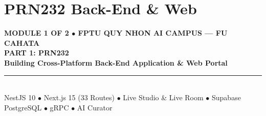 \documentclass[aspectratio=169,10pt]{beamer}
\begin{document}
\section{PRN232 Back-End \& Web}
{
\begin{frame}[plain]
  \begin{center}
    \vspace{10mm}
    {\scriptsize\bfseries\color{omniCyan}MODULE 1 OF 2 $\bullet$ FPTU QUY NHON AI CAMPUS --- FU CAHATA}\\[3mm]
    {\Huge\bfseries\color{white}PART 1: PRN232}\\[3mm]
    {\Large\bfseries\color{omniBlue}Building Cross-Platform Back-End Application \& Web Portal}\\[4mm]
    {\color{omniBorder}\rule{0.5\linewidth}{1pt}}\\[4mm]
    {\footnotesize\color{omniSlate}NestJS 10 $\bullet$ Next.js 15 (33 Routes) $\bullet$ Live Studio \& Live Room $\bullet$ Supabase PostgreSQL $\bullet$ gRPC $\bullet$ AI Curator}
  \end{center}
\end{frame}
}
\end{document}
